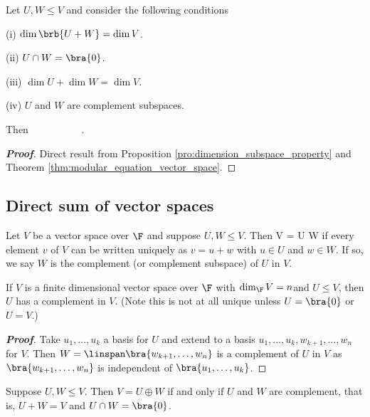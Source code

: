 \begin{corollary}\label{cor:dimension_sum_intersection_zero_iff_complement_subspaces}
Let $U,W\leq V$ and consider the following conditions
\ben
\item [(i)] $\dim\brb{U+W} = \dim V$.
\item [(ii)] $U \cap W = \bra{0}$.
\item [(iii)] $\dim U + \dim W = \dim V$.
\item [(iv)] $U$ and $W$ are complement subspaces.
\een

Then
\be
{} \ \lra \  \ \lra \  \ \lra\  \ \lra \ .
\ee
\end{corollary}

\begin{proof}[\bf Proof]
Direct result from Proposition \ref{pro:dimension_subspace_property} and Theorem \ref{thm:modular_equation_vector_space}.
\end{proof}


\subsection{Direct sum of vector spaces}


\begin{definition}\label{def:direct_sum_vector_space}
Let $V$ be a vector space over $\F$ and suppose $U,W \leq  V$. Then
\be
V = U \oplus W
\ee
if every element $v$ of $V$ can be written uniquely as $v = u + w$ with $u \in U$ and $w \in W$. If so, we say $W$ is the complement (or complement subspace) of $U$ in $V$.
\end{definition}


\begin{lemma}
If $V$ is a finite dimensional vector space over $\F$ with $\dim_{\F}V = n$and $U \leq V$, then $U$ has a complement in $V$. (Note this is not at all unique unless $U = \bra{0}$ or $U = V$.)
\end{lemma}

\begin{proof}[\bf Proof]
Take $u_1, \dots, u_k$ a basis for $U$ and extend to a basis $u_1, \dots, u_k,w_{k+1}, \dots,w_n$ for $V$. Then $W = \linspan\bra{w_{k+1}, \dots, w_n}$ is a complement of $U$ in $V$ as $\bra{w_{k+1}, \dots, w_n}$ is independent of $\bra{u_1, \dots, u_k}$.
\end{proof}

\begin{lemma}\label{lem:direct_sum_vector_space}
Suppose $U,W \leq V$. Then $V = U \oplus W$ if and only if $U$ and $W$ are complement, that is, $U + W = V$ and $U \cap W = \bra{0}$.
\end{lemma}

